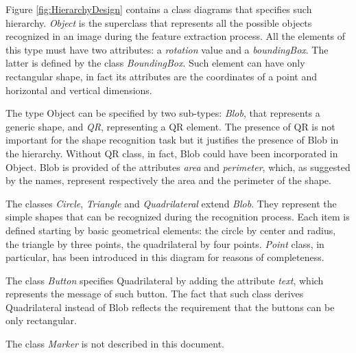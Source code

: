		Figure \ref{fig:HierarchyDesign} contains a class diagrams that specifies such hierarchy. 
		\emph{Object} is the superclass that represents all the possible objects recognized in an image during the feature extraction process. 
		All the elements of this type must have two attributes: a \emph{rotation} value and a \emph{boundingBox}. 
		The latter is defined by the class \emph{BoundingBox}. Such element can have only rectangular shape, in fact its attributes are the coordinates of a point and horizontal and vertical dimensions.


		The type Object can be specified by two sub-types: \emph{Blob}, that represents a generic shape, and \emph{QR}, representing a \mbox{QR} element. The presence of \mbox{QR} is not important for the shape recognition task but it justifies the presence of Blob in the hierarchy. Without \mbox{QR} class, in fact, Blob could have been incorporated in Object.
		Blob is provided of the attributes \emph{area} and \emph{perimeter}, which, as suggested by the names, represent respectively the area and the perimeter of the shape.
	

		The classes \emph{Circle}, \emph{Triangle} and \emph{Quadrilateral} extend \emph{Blob}. They represent the simple shapes that can be recognized during the recognition process. Each item is defined starting by basic geometrical elements: the circle by center and radius, the triangle by three points, the quadrilateral by four points. \emph{Point} class, in particular, has been introduced in this diagram for reasons of completeness. 

		The class \emph{Button} specifies Quadrilateral by adding the attribute \emph{text}, which represents the message of such button. The fact that such class derives Quadrilateral instead of Blob reflects the requirement that the buttons can be only rectangular. 
	
		The class \emph{Marker} is not described in this document. 
	
